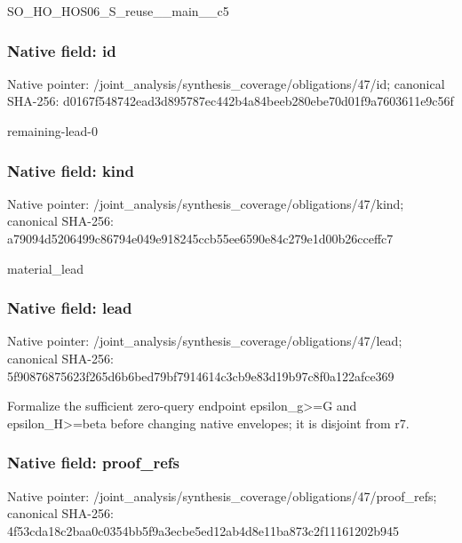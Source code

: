\documentclass[10pt,a4paper]{article}
\begin{document}
\begingroup\raggedright\sloppy SO\_\allowbreak{}HO\_\allowbreak{}HOS06\_\allowbreak{}S\_\allowbreak{}reuse\_\allowbreak{}\_\allowbreak{}main\_\allowbreak{}\_\allowbreak{}c5\par\endgroup

\subsubsection{Native field: id}
Native pointer: /joint\_\allowbreak{}analysis/synthesis\_\allowbreak{}coverage/obligations/47/id; canonical SHA-256: d0167f548742ead3d895787ec442b4a84beeb280ebe70d01f9a7603611e9c56f

\begingroup\raggedright\sloppy remaining-lead-0\par\endgroup

\subsubsection{Native field: kind}
Native pointer: /joint\_\allowbreak{}analysis/synthesis\_\allowbreak{}coverage/obligations/47/kind; canonical SHA-256: a79094d5206499c86794e049e918245ccb55ee6590e84c279e1d00b26cceffc7

\begingroup\raggedright\sloppy material\_\allowbreak{}lead\par\endgroup

\subsubsection{Native field: lead}
Native pointer: /joint\_\allowbreak{}analysis/synthesis\_\allowbreak{}coverage/obligations/47/lead; canonical SHA-256: 5f90876875623f265d6b6bed79bf7914614c3cb9e83d19b97c8f0a122afce369

\begingroup\raggedright\sloppy Formalize the sufficient zero-query endpoint epsilon\_\allowbreak{}g>=\allowbreak{}G and epsilon\_\allowbreak{}H>=\allowbreak{}beta before changing native envelopes;\allowbreak{} it is disjoint from r7.\par\endgroup

\subsubsection{Native field: proof\_\allowbreak{}refs}
Native pointer: /joint\_\allowbreak{}analysis/synthesis\_\allowbreak{}coverage/obligations/47/proof\_\allowbreak{}refs; canonical SHA-256: 4f53cda18c2baa0c0354bb5f9a3ecbe5ed12ab4d8e11ba873c2f11161202b945
\end{document}
